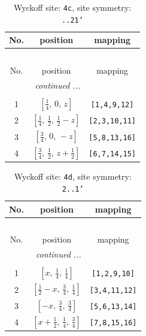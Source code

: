 \documentclass[fleqn,8pt]{jsarticle}
\begin{document}
\renewcommand{\arraystretch}{1.2}
\begin{longtable}{ccc}
\caption{Wyckoff site: {\tt 4c}, site symmetry: {\tt ..21'}}
 \\
 \hline \hline
No. & position & mapping \\ \hline \endfirsthead

\multicolumn{2}{l}{\tablename\ \thetable{}} \\
 \hline \hline
No. & position & mapping \\ \hline \endhead

 \hline \hline
\multicolumn{2}{r}{\footnotesize\it continued ...} \\ \endfoot

 \hline \hline
\multicolumn{2}{r}{} \\ \endlastfoot

1 & $\left[ \frac{1}{4},\, 0,\, z \right]$ & {\tt [1,4,9,12]} \\ \hline
2 & $\left[ \frac{1}{4},\, \frac{1}{2},\, \frac{1}{2} - z \right]$ & {\tt [2,3,10,11]} \\ \hline
3 & $\left[ \frac{3}{4},\, 0,\, - z \right]$ & {\tt [5,8,13,16]} \\ \hline
4 & $\left[ \frac{3}{4},\, \frac{1}{2},\, z + \frac{1}{2} \right]$ & {\tt [6,7,14,15]} \\
\end{longtable}
\renewcommand{\arraystretch}{1.2}
\begin{longtable}{ccc}
\caption{Wyckoff site: {\tt 4d}, site symmetry: {\tt 2..1'}}
 \\
 \hline \hline
No. & position & mapping \\ \hline \endfirsthead

\multicolumn{2}{l}{\tablename\ \thetable{}} \\
 \hline \hline
No. & position & mapping \\ \hline \endhead

 \hline \hline
\multicolumn{2}{r}{\footnotesize\it continued ...} \\ \endfoot

 \hline \hline
\multicolumn{2}{r}{} \\ \endlastfoot

1 & $\left[ x,\, \frac{1}{4},\, \frac{1}{4} \right]$ & {\tt [1,2,9,10]} \\ \hline
2 & $\left[ \frac{1}{2} - x,\, \frac{3}{4},\, \frac{1}{4} \right]$ & {\tt [3,4,11,12]} \\ \hline
3 & $\left[ - x,\, \frac{3}{4},\, \frac{3}{4} \right]$ & {\tt [5,6,13,14]} \\ \hline
4 & $\left[ x + \frac{1}{2},\, \frac{1}{4},\, \frac{3}{4} \right]$ & {\tt [7,8,15,16]} \\
\end{longtable}
\end{document}
